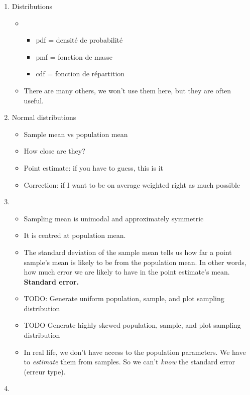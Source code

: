 \begin{enumerate}
\item Distributions
  \begin{itemize}
  \item {}
    \begin{itemize}
    \item pdf = densité de probabilité
    \item pmf = fonction de masse
    \item cdf = fonction de répartition
    \end{itemize}
  \item There are many others, we won't use them here, but they are often useful.
  \end{itemize}
\item Normal distributions
  \begin{itemize}
  \item Sample mean vs population mean
  \item How close are they?
  \item Point estimate: if you have to guess, this is it
  \item Correction: if I want to be on average weighted right as much possible
  \end{itemize}
\item {}
  \begin{itemize}
  \item Sampling mean is unimodal and approximately symmetric
  \item It is centred at population mean.
    \item The standard deviation of the sample mean tells us how far a
      point sample's mean is likely to be from the population mean.
      In other words, how much error we are likely to have in the
      point estimate's mean.  \textbf{Standard error.}
    \item TODO: Generate uniform population, sample,
      and plot sampling distribution
    \item TODO Generate highly skewed population, sample, and plot
      sampling distribution
    \item In real life, we don't have access to the population
      parameters.  We have to \textit{estimate} them from samples.  So
      we can't \textit{know} the standard error (erreur type).
  \end{itemize}
\item {}
  \begin{itemize}

\end{itemize}
\end{enumerate}
